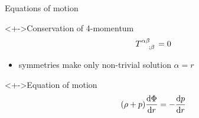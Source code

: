 \documentclass{beamer}
\let\svthefootnote\thefootnote
\newcommand\blankfootnote[1]{%
  \let\thefootnote\relax\footnotetext{#1}%
  \let\thefootnote\svthefootnote%
}
\begin{document}
\begin{frame}{Equations of motion}

\begin{block}<+->{Conservation of 4-momentum}
\begin{displaymath}
  \tensor{T}{^{\alpha\beta}_{;\beta}} = 0
\end{displaymath}
\end{block}

\begin{itemize}
\item<+-> symmetries make only non-trivial solution $\alpha = r$
\end{itemize}

\begin{block}<+->{Equation of motion}
\begin{displaymath}
  (\rho + p) \dv{\Phi}{r} = -\dv{p}{r}
\end{displaymath}
\end{block}

\blankfootnote{\textcite[pp. 175, 261]{Schutz}}



\end{frame}

\end{document}
